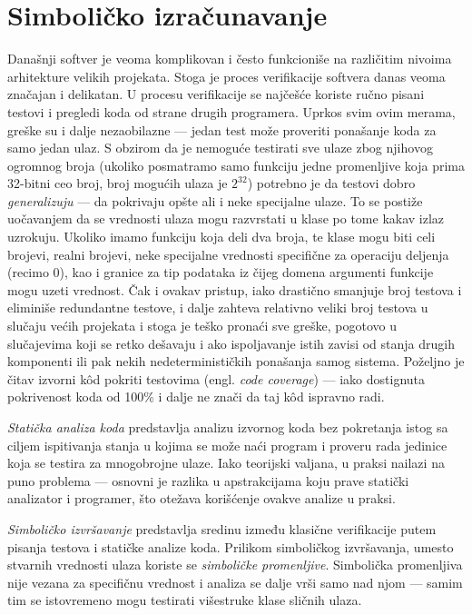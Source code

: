 \chapter{Simboličko izračunavanje}
\label{sec:Symbolics}

Današnji softver je veoma komplikovan i često funkcioniše na različitim nivoima arhitekture velikih projekata. Stoga je proces verifikacije softvera danas veoma značajan i delikatan. U procesu verifikacije se najčešće koriste ručno pisani testovi i pregledi koda od strane drugih programera. Uprkos svim ovim merama, greške su i dalje nezaobilazne --- jedan test može proveriti ponašanje koda za samo jedan ulaz. S obzirom da je nemoguće testirati sve ulaze zbog njihovog ogromnog broja (ukoliko posmatramo samo funkciju jedne promenljive koja prima 32-bitni ceo broj, broj mogućih ulaza je $2^{32}$) potrebno je da testovi dobro \emph{generalizuju} --- da pokrivaju opšte ali i neke specijalne ulaze. To se postiže uočavanjem da se vrednosti ulaza mogu razvrstati u klase po tome kakav izlaz uzrokuju. Ukoliko imamo funkciju koja deli dva broja, te klase mogu biti celi brojevi, realni brojevi, neke specijalne vrednosti specifične za operaciju deljenja (recimo $0$), kao i granice za tip podataka iz čijeg domena argumenti funkcije mogu uzeti vrednost. Čak i ovakav pristup, iako drastično smanjuje broj testova i eliminiše redundantne testove, i dalje zahteva relativno veliki broj testova u slučaju većih projekata i stoga je teško pronaći sve greške, pogotovo u slučajevima koji se retko dešavaju i ako ispoljavanje istih zavisi od stanja drugih komponenti ili pak nekih nedeterminističkih ponašanja samog sistema. Poželjno je čitav izvorni k\^od pokriti  testovima (engl. \emph{code coverage}) --- iako dostignuta pokrivenost koda od 100\% i dalje ne znači da taj k\^od ispravno radi.

\emph{Statička analiza koda} predstavlja analizu izvornog koda bez pokretanja istog sa ciljem ispitivanja stanja u kojima se može naći program i proveru rada jedinice koja se testira za mnogobrojne ulaze. Iako teorijski valjana, u praksi nailazi na puno problema --- osnovni je razlika u apstrakcijama koju prave statički analizator i programer, što otežava korišćenje ovakve analize u praksi.

\emph{Simboličko izvršavanje} \cite{SymbolicExecution} predstavlja sredinu između klasične verifikacije putem pisanja testova i statičke analize koda. Prilikom simboličkog izvršavanja, umesto stvarnih vrednosti ulaza koriste se \emph{simboličke promenljive}. Simbolička promenljiva nije vezana za specifičnu vrednost i analiza se dalje vrši samo nad njom --- samim tim se istovremeno mogu testirati višestruke klase sličnih ulaza. 

